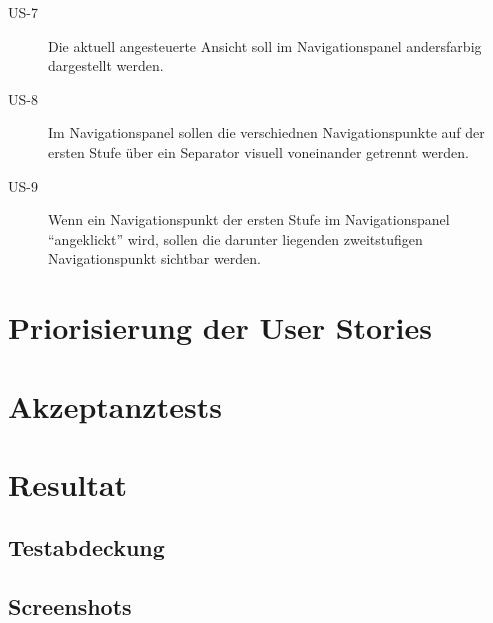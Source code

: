 \begin{description}
\item[US-7\label{itm:US-7}]
Die aktuell angesteuerte Ansicht soll im Navigationspanel andersfarbig
dargestellt werden.

\item[US-8\label{itm:US-8}]
Im Navigationspanel sollen die verschiednen Navigationspunkte auf der ersten
Stufe über ein Separator visuell voneinander getrennt werden.

\item[US-9\label{itm:US-9}]
Wenn ein Navigationspunkt der ersten Stufe im Navigationspanel ``angeklickt''
wird, sollen die darunter liegenden zweitstufigen Navigationspunkt sichtbar
werden.
\end{description}

\section{Priorisierung der User Stories}

\section{Akzeptanztests}

\section{Resultat}

\subsection{Testabdeckung}

\subsection{Screenshots}